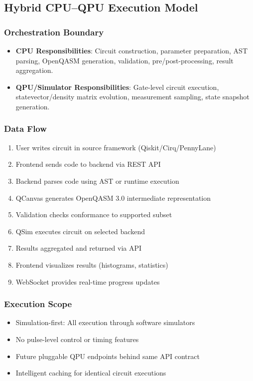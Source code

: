 \subsection{Hybrid CPU–QPU Execution Model}

\subsubsection{Orchestration Boundary}
\begin{itemize}
    \item \textbf{CPU Responsibilities}: Circuit construction, parameter preparation, AST parsing, OpenQASM generation, validation, pre/post-processing, result aggregation.
    \item \textbf{QPU/Simulator Responsibilities}: Gate-level circuit execution, statevector/density matrix evolution, measurement sampling, state snapshot generation.
\end{itemize}

\subsubsection{Data Flow}
\begin{enumerate}
    \item User writes circuit in source framework (Qiskit/Cirq/PennyLane)
    \item Frontend sends code to backend via REST API
    \item Backend parses code using AST or runtime execution
    \item QCanvas generates OpenQASM 3.0 intermediate representation
    \item Validation checks conformance to supported subset
    \item QSim executes circuit on selected backend
    \item Results aggregated and returned via API
    \item Frontend visualizes results (histograms, statistics)
    \item WebSocket provides real-time progress updates
\end{enumerate}

\subsubsection{Execution Scope}
\begin{itemize}
    \item Simulation-first: All execution through software simulators
    \item No pulse-level control or timing features
    \item Future pluggable QPU endpoints behind same API contract
    \item Intelligent caching for identical circuit executions
\end{itemize}


